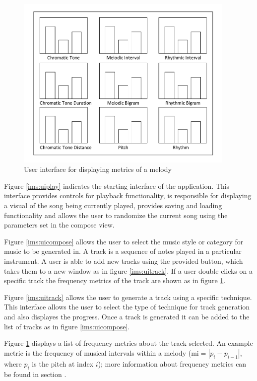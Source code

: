 \begin{figure}
\centerline{\includegraphics[width=400px]{../images/ui_metrics.pdf}}
\caption{User interface for displaying metrics of a melody}
\label{ims:uimetrics}
\end{figure}

Figure \ref{ims:uiplay} indicates the starting interface of the application. This interface provides controls for playback functionality, is responsible for displaying a visual of the song being currently played, provides saving and loading functionality and allows the user to randomize the current song using the parameters set in the compose view.

Figure \ref{ims:uicompose} allows the user to select the music style or category for music to be generated in. A track is a sequence of notes played in a particular instrument. A user is able to add new tracks using the provided button, which takes them to a new window as in figure \ref{ims:uitrack}. If a user double clicks on a specific track the frequency metrics of the track are shown as in figure \ref{ims:uimetrics}.

Figure \ref{ims:uitrack} allows the user to generate a track using a specific technique. This interface allows the user to select the type of technique for track generation and also displayes the progress. Once a track is generated it can be added to the list of tracks as in figure \ref{ims:uicompose}.

Figure \ref{ims:uimetrics} displays a list of frequency metrics about the track selected. An example metric is the frequency of musical intervals within a melody ($\text{mi} = |p_i - p_{i-1}|$, where $p_i$ is the pitch at index $i$); more information about frequency metrics can be found in section \label{chap:metrics}.
 
